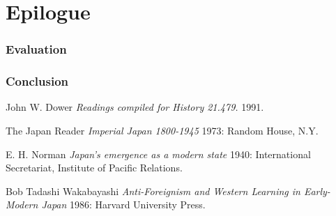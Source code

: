 \documentclass[12pt]{article}
\begin{document}
\pagebreak
\part{Epilogue}
\pagebreak
\section{Evaluation}
\section{Conclusion}



\begin{thebibliography}{1}

   John W. Dower {\em Readings compiled for History
  21.479.}  1991.

    The Japan Reader {\em Imperial Japan 1800-1945} 1973:
  Random House, N.Y.

   E. H. Norman {\em Japan's emergence as a modern
  state} 1940: International Secretariat, Institute of Pacific
  Relations.

   Bob Tadashi Wakabayashi {\em Anti-Foreignism and Western
  Learning in Early-Modern Japan} 1986: Harvard University Press.

\end{thebibliography}
\end{document}
